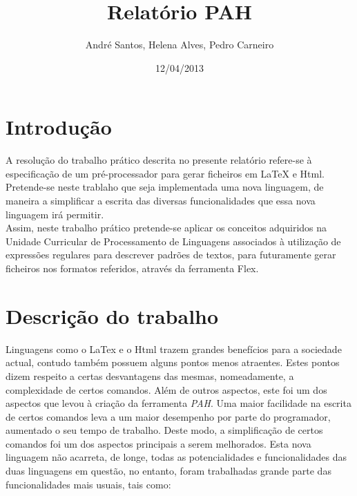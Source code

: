 \documentclass[11pt,a4paper]{article}
\begin{document}
    \title{ Relatório PAH }
    \author{ André Santos, Helena Alves, Pedro Carneiro }
    \date{ 12/04/2013 }


\maketitle
\newpage
\tableofcontents
\newpage


 
\section{Introdução}
A resolução do trabalho prático descrita no presente relatório refere-se à especificação de um pré-processador para gerar ficheiros em LaTeX e Html. Pretende-se neste trablaho que seja implementada uma nova linguagem, de maneira a simplificar a escrita das diversas funcionalidades que essa nova linguagem irá permitir. \\ 


Assim, neste trabalho prático pretende-se aplicar os conceitos adquiridos na Unidade Curricular de Processamento de Linguagens associados à utilização de expressões regulares para descrever padrões de textos, para futuramente gerar ficheiros nos formatos referidos, através da ferramenta Flex.  \newpage 


\section{Descrição do trabalho}
Linguagens como o LaTex e o Html trazem grandes benefícios para a sociedade actual, contudo também possuem alguns pontos menos atraentes. Estes pontos dizem respeito a certas desvantagens das mesmas, nomeadamente, a complexidade de certos comandos. Além de outros aspectos, este foi um dos aspectos que levou à criação da ferramenta \textit{PAH}. Uma maior facilidade na escrita de certos comandos leva a um maior desempenho por parte do programador, aumentado o seu tempo de trabalho. Deste modo, a simplificação de certos comandos foi um dos aspectos principais a serem melhorados. 
Esta nova linguagem não acarreta, de longe, todas as potencialidades e funcionalidades das duas linguagens em questão, no entanto, foram trabalhadas grande parte das funcionalidades mais usuais, tais como: 
\end{document}
